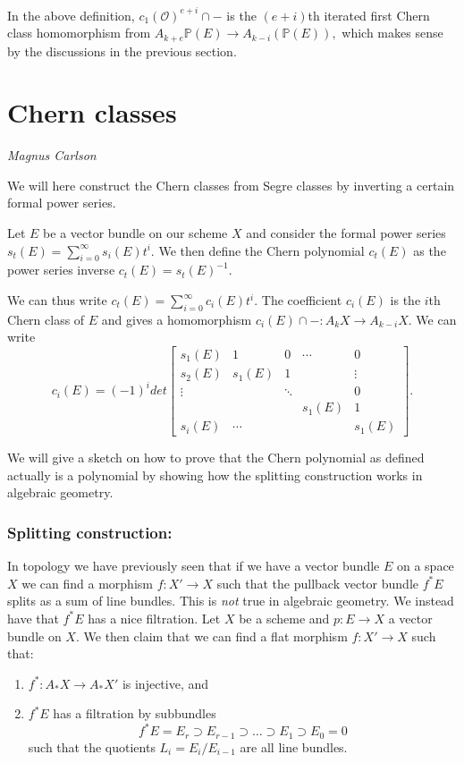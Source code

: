 \documentclass[a4paper,openany]{scrbook}
\newcommand{\chapterauthor}[1]{\hfill\emph{#1}\par\noindent}
\begin{document}
In the above definition, $c_1(\mathcal{O})^{e+i} \cap -$ is the $(e+i)$th iterated first Chern class homomorphism from $A_{k+e}\mathbb{P}(E) \rightarrow A_{k-i}(\mathbb{P}(E)),$ which makes sense by the discussions in the previous section.

\section{Chern classes}
\chapterauthor{Magnus Carlson}

We will here construct the Chern classes from Segre classes by inverting a certain formal power series. 

\begin{defn}
Let $E$ be a vector bundle on our scheme $X$ and consider the formal power series $s_t(E) = \sum_{i=0}^\infty s_i(E)t^i.$  We then define the Chern polynomial $c_t(E)$ as the power series inverse $c_t(E) = s_t(E)^{-1}.$
\end{defn}

We can thus write $c_t(E) = \sum_{i=0}^{\infty} c_i(E)t^i.$ The coefficient $c_i(E)$ is the $i$th Chern class of $E$ and gives a homomorphism $c_i(E) \cap -: A_k X \rightarrow A_{k-i}X.$ We can write
\[
c_i(E) = (-1)^i det \begin{bmatrix} s_1(E) & 1 & 0 & \cdots & 0 \\ s_2(E) & s_1(E) & 1 & & \vdots \\ \vdots &  & \ddots & & 0 \\ & & & s_1(E) & 1 \\ s_i(E) & \cdots & & & s_1(E) \end{bmatrix}.
\]

We will give a sketch on how to prove that the Chern polynomial as defined actually is a polynomial by showing how the splitting construction works in algebraic geometry.

\subsubsection*{Splitting construction:}

In topology we have previously  seen that if we have a vector bundle $E$ on a space $X$ we can find a morphism $f\colon X' \rightarrow X$ such that the pullback vector bundle $f^\ast E$ splits as a sum of line bundles. This is \emph{not} true in algebraic geometry. We instead have that $f^\ast E$ has a nice filtration.  Let $X$ be a scheme and $p\colon E \rightarrow X$ a vector bundle on $X.$ We then claim that we can find a flat morphism $f\colon X' \rightarrow X$ such that:
\begin{enumerate}
\item $f^\ast: A_\ast X \rightarrow A_\ast X' $ is injective, and 
\item $f^\ast E$ has a filtration by subbundles
\[
f^\ast E = E_r \supset E_{r-1} \supset \ldots \supset E_1 \supset E_0=0
\]
such that the quotients $L_i = E_i / E_{i-1}$ are all line bundles. 
\end{enumerate}
\end{document}
